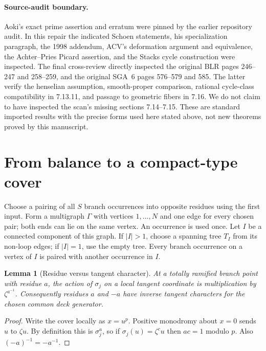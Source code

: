 \documentclass[11pt]{article}
\newtheorem{lemma}[theorem]{Lemma}
\theoremstyle{definition}
\begin{document}
\paragraph{Source-audit boundary.}
Aoki's exact prime assertion and erratum were pinned by the earlier repository
audit. In this repair the indicated Schoen statements, his specialization
paragraph, the 1998 addendum, ACV's deformation argument and equivalence, the
Achter--Pries Picard assertion, and the Stacks cycle construction were inspected.
The final cross-review directly inspected the original BLR pages 246--247 and
258--259, and the original SGA~6 pages 576--579 and 585. The latter verify
the henselian assumption, smooth-proper comparison, rational cycle-class
compatibility in 7.13.11, and passage to geometric fibers in 7.16. We do not
claim to have inspected the scan's missing sections 7.14--7.15. These are
standard imported results with the precise forms used here stated above,
not new theorems proved by this manuscript.

\section{From balance to a compact-type cover}\label{sec:glue}
Choose a pairing of all $S$ branch occurrences into opposite residues using
the first input. Form a multigraph $\Gamma$ with vertices $1,\ldots,N$ and
one edge for every chosen pair; both ends can lie on the same vertex. An
occurrence is used once. Let $I$ be a connected component of this graph.
If $|I|>1$, choose a spanning tree $T_I$ from its non-loop edges; if $|I|=1$,
use the empty tree. Every branch occurrence on a vertex of $I$ is paired with
another occurrence in $I$.

\begin{lemma}[Residue versus tangent character]\label{lem:tangent}
At a totally ramified branch point with residue $a$, the action of $\sigma_j$
on a local tangent coordinate is multiplication by $\zeta^{a^{-1}}$.
Consequently residues $a$ and $-a$ have inverse tangent characters for the
chosen common deck generator.
\end{lemma}
\begin{proof}
Write the cover locally as $x=u^p$. Positive monodromy about $x=0$ sends
$u$ to $\zeta u$. By definition this is $\sigma_j^a$, so if
$\sigma_j(u)=\zeta^c u$ then $ac=1$ modulo $p$. Also
$(-a)^{-1}=-a^{-1}$.
\end{proof}
\end{document}
